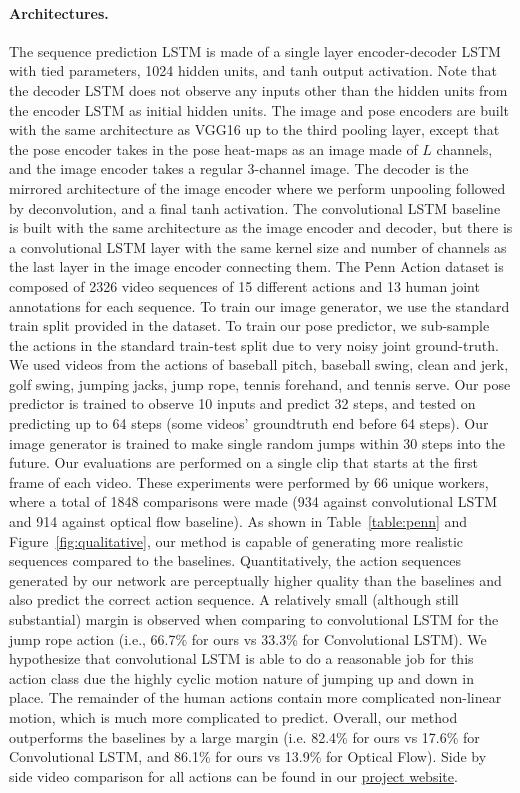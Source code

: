 \documentclass{article}
\begin{document}
\vspace{-8pt}\paragraph{Architectures.}
The sequence prediction LSTM is made of a single layer encoder-decoder LSTM with tied parameters, 1024 hidden units, and tanh output activation.
Note that the decoder LSTM does not observe any inputs other than the hidden units from the encoder LSTM as initial hidden units.
The image and pose encoders are built with the same architecture as VGG16 \cite{Vgg16} up to the third pooling layer, except that the pose encoder takes in the pose heat-maps as an image made of $L$ channels, and the image encoder takes a regular $3$-channel image.
The decoder is the mirrored architecture of the image encoder where we perform unpooling followed by deconvolution, and a final tanh activation.
The convolutional LSTM baseline is built with the same architecture as the image encoder and decoder, but there is a convolutional LSTM layer with the same kernel size and number of channels as the last layer in the image encoder connecting them.
The Penn Action dataset is composed of 2326 video sequences of 15 different actions and 13 human joint annotations for each sequence.
To train our image generator, we use the standard train split provided in the dataset.
To train our pose predictor, we sub-sample the actions in the standard train-test split due to very noisy joint ground-truth.
We used videos from the actions of baseball pitch, baseball swing, clean and jerk, golf swing, jumping jacks, jump rope, tennis forehand, and tennis serve.
Our pose predictor is trained to observe 10 inputs and predict 32 steps, and tested on predicting up to 64 steps (some videos' groundtruth end before 64 steps).
Our image generator is trained to make single random jumps within 30 steps into the future.
Our evaluations are performed on a single clip that starts at the first frame of each video.
These experiments were performed by 66 unique workers, where a total of 1848 comparisons were made (934 against convolutional LSTM and 914 against optical flow baseline).
As shown in Table~\ref{table:penn} and Figure~\ref{fig:qualitative}, our method is capable of generating more realistic sequences compared to the baselines.
Quantitatively, the action sequences generated by our network are perceptually higher quality than the baselines and also predict the correct action sequence. 
A relatively small (although still substantial) margin is observed when comparing to convolutional LSTM for the jump rope action (i.e., 66.7\% for ours vs 33.3\% for Convolutional LSTM).
We hypothesize that convolutional LSTM is able to do a reasonable job for this action class due the highly cyclic motion nature of jumping up and down in place.
The remainder of the human actions contain more complicated non-linear motion, which is much more complicated to predict.
Overall, our method outperforms the baselines by a large margin (i.e. 82.4\% for ours vs 17.6\% for Convolutional LSTM, and 86.1\% for ours vs 13.9\% for Optical Flow).
Side by side video comparison for all actions can be found in our \href{https://goo.gl/U7UOfy}{project website}.
\end{document}
